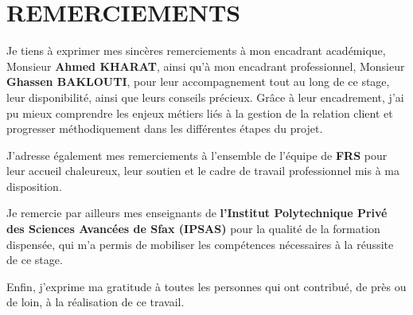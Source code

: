 \chapter*{REMERCIEMENTS}
\thispagestyle{MyStyle}
\mbox{}

Je tiens à exprimer mes sincères remerciements à mon encadrant académique, Monsieur \textbf{Ahmed KHARAT}, ainsi qu'à mon encadrant professionnel, Monsieur \textbf{Ghassen BAKLOUTI}, pour leur accompagnement tout au long de ce stage, leur disponibilité, ainsi que leurs conseils précieux. Grâce à leur encadrement, j'ai pu mieux comprendre les enjeux métiers liés à la gestion de la relation client et progresser méthodiquement dans les différentes étapes du projet.\par
\vspace{0.3cm}

J'adresse également mes remerciements à l'ensemble de l'équipe de \textbf{FRS} pour leur accueil chaleureux, leur soutien et le cadre de travail professionnel mis à ma disposition.\par
\vspace{0.3cm}

Je remercie par ailleurs mes enseignants de \textbf{l'Institut Polytechnique Privé des Sciences Avancées de Sfax (IPSAS)} pour la qualité de la formation dispensée, qui m'a permis de mobiliser les compétences nécessaires à la réussite de ce stage.\par
\vspace{0.3cm}

Enfin, j'exprime ma gratitude à toutes les personnes qui ont contribué, de près ou de loin, à la réalisation de ce travail.\par
